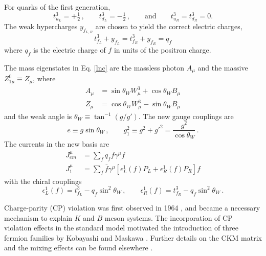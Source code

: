 For quarks of the first generation, 
\begin{equation}
t_{u_L}^3=+\tfrac{1}{2}\,,\qquad t_{d_L}^3=-\tfrac{1}{2}\,,\qquad \text{and}\qquad t_{u_R}^3=t_{d_R}^3=0. 
\end{equation}
The weak hypercharges $y_{f_{L,R}}$ are chosen to yield the correct electric charges,
\begin{equation}
t_{f_L}^3 + y_{f_L} = t_{f_R}^3 + y_{f_R} = q_{f}
\end{equation}
where $q_f$ is the electric charge of $f$ in units of the positron charge. 

The mass eigenstates in Eq. \ref{lnc} are the massless photon $A_\mu$ and the massive $Z_{1\mu}^0 \equiv Z_\mu$, where
\begin{align}
A_\mu &= \sin\theta_W W_\mu^3 + \cos\theta_W B_\mu \label{foton}\\
Z_\mu &= \cos\theta_W W_\mu^3 - \sin\theta_W B_\mu 
\end{align}
and the weak angle is $\theta_W \equiv \tan^{-1}(g/g')$. The new gauge couplings are
\begin{equation}
e \equiv g\sin\theta_W \,, \qquad g_1^2 \equiv g^2+g'^2=\frac{g^2}{\cos\theta_W} \,. \label{Zqqcoup}
\end{equation}
The currents in the new basis are
\begin{align}
J_{em}^\mu &= \sum_{f}q_f\bar{f}\gamma^\mu f \\
J_1^\mu &= \sum_{f}\bar{f}\gamma^\mu [\epsilon_L^1(f) P_L + \epsilon_R^1(f)  P_R]f 
\end{align}
with the chiral couplings
\begin{equation}
\epsilon_L^1(f)=t_{f_L}^3-q_f\sin^2\theta_W \,,\qquad \epsilon_R^1(f)=t_{f_R}^3-q_f\sin^2\theta_W \,. \label{Chiralcoup}
\end{equation}

Charge-parity (CP) violation was first observed in 1964 \cite{Christenson:1964fg}, and became a necessary mechanism to explain $K$ and $B$ meson systems. The incorporation of CP violation effects in the standard model motivated the introduction of three fermion families by Kobayashi and Maskawa \cite{Kobayashi:1973fv}. Further details on the CKM matrix and the mixing effects can be found elsewhere \cite{Langacker:2010zza}. 


